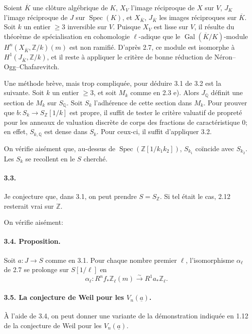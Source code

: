 \documentclass[10pt]{article}
\newcommand{\Q}{\mathbb Q}
\newcommand{\Z}{\mathbb Z}
\newcommand{\Spec}{\operatorname{Spec}}
\newcommand{\Gal}{\operatorname{Gal}}
\newcommand{\iso}{\xrightarrow{\sim}}
\begin{document}
Soient \(\overline K\) une clôture algébrique de \(K\), \(X_V\) l'image réciproque de \(X\) sur \(V\), \(J_K\) l'image réciproque de \(J\) sur \(\Spec(K)\), et \(X_{\overline K}\), \(J_{\overline K}\) les images réciproques sur \(\overline K\). Soit \(k\) un entier \(\ge3\) inversible sur \(V\). Puisque \(X_V\) est lisse sur \(V\), il résulte du théorème de spécialisation en cohomologie \(\ell\)-adique que le \(\Gal(\overline K/K)\)-module \(H^n(X_{\overline K},\Z/k)(m)\) est non ramifié. D'après 2.7, ce module est isomorphe à \(H^1(J_{\overline K},\Z/k)\), et il reste à appliquer le critère de bonne réduction de Néron--Ogg--Chafarevitch.

Une méthode brève, mais trop compliquée, pour déduire 3.1 de 3.2 est la suivante. Soit \(k\) un entier \(\ge3\), et soit \(M_k\) comme en 2.3 e). Alors \(J_\Q\) définit une section de \(M_k\) sur \(S_\Q\). Soit \(S_k\) l'adhérence de cette section dans \(M_k\). Pour prouver que \(b:S_k\to S_\Z[1/k]\) est propre, il suffit de tester le critère valuatif de propreté pour les anneaux de valuation discrète de corps des fractions de caractéristique \(0\); en effet, \(S_{k,\Q}\) est dense dans \(S_k\). Pour ceux-ci, il suffit d'appliquer 3.2.

On vérifie aisément que, au-dessus de \(\Spec(\Z[1/k_1k_2])\), \(S_{k_1}\) coïncide avec \(S_{k_2}\). Les \(S_k\) se recollent en le \(S\) cherché.

\paragraph{3.3.} Je conjecture que, dans 3.1, on peut prendre \(S=S_\Z\). Si tel était le cas, 2.12 resterait vrai sur \(\Z\).

On vérifie aisément:

\paragraph{3.4. Proposition.} Soit \(a:J\to S\) comme en 3.1. Pour chaque nombre premier \(\ell\), l'isomorphisme \(\alpha_\ell\) de 2.7 se prolonge sur \(S[1/\ell]\) en
\[
\alpha_\ell:R^nf_*\Z_\ell(m)\iso R^1a_*\Z_\ell.
\]

\paragraph{3.5. La conjecture de Weil pour les \(V_n(\underline a)\).} À l'aide de 3.4, on peut donner une variante de la démonstration indiquée en 1.12 de la conjecture de Weil pour les \(V_n(\underline a)\).
\end{document}
